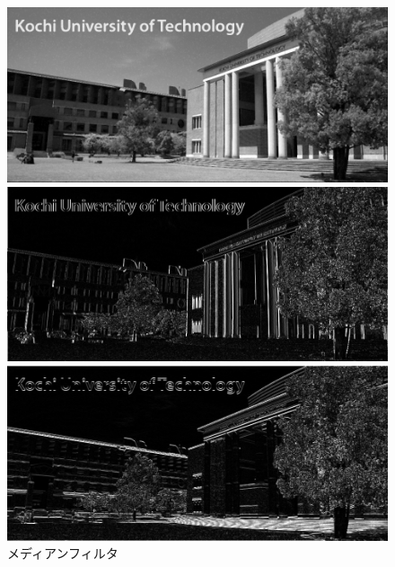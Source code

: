 \begin{figure}[h]
\begin{minipage}[b]{.49\textwidth}
\begin{minipage}[b]{.49\textwidth}
            \subcaption{\wgnimg}
        \end{minipage}
        \begin{minipage}[b]{.49\textwidth}
            \includegraphics[keepaspectratio,width=\textwidth]{../../Figures/06_24_mf_img_in.png}
            \subcaption{\inimg}
        \end{minipage}
        \caption{メディアンフィルタ}
    \end{minipage}
    \begin{minipage}[b]{.3\textwidth}
        \centering
        \includegraphics[keepaspectratio,width=\textwidth]{../../Figures/06_31_diff-x-img.png}
    \end{minipage}
    \begin{minipage}[b]{.3\textwidth}
        \centering
        \includegraphics[keepaspectratio,width=\textwidth]{../../Figures/06_32_diff-y-img.png}

\end{minipage}
\end{figure}

